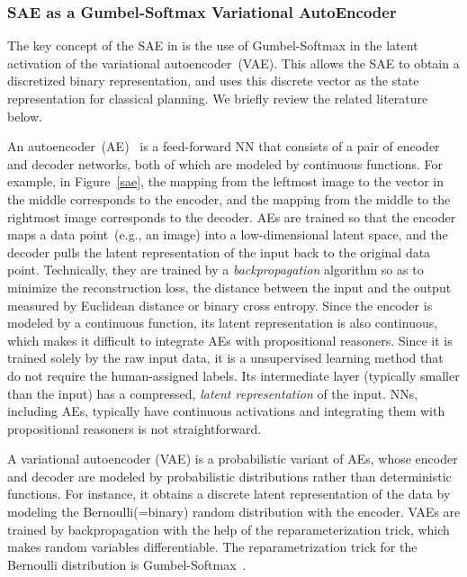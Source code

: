 \subsubsection{SAE as a Gumbel-Softmax Variational AutoEncoder}

The key concept of the SAE in \latentplanner is the use of Gumbel-Softmax \cite{jang2016categorical}
in the latent activation of the variational autoencoder~(VAE).
This allows the SAE to obtain a discretized binary representation, and \latentplanner uses this
discrete vector as the state representation for classical planning.
We briefly review the related literature below.

An autoencoder~(AE)~\cite{hinton2006reducing} is a feed-forward NN that consists of a pair of encoder and decoder networks, both of which are modeled by continuous functions.
For example, in Figure~\ref{sae}, the mapping from the leftmost image to the vector in the middle corresponds to the encoder, and the mapping from the middle to the rightmost image corresponds to the decoder.
AEs are trained so that the encoder maps a data point~(e.g., an image) into a low-dimensional latent space, and the decoder pulls the latent representation of the input back to the original data point.
Technically, they are trained by a \emph{backpropagation} algorithm so as to minimize the reconstruction loss, the distance between the input and the output measured by Euclidean distance or binary cross entropy.
Since the encoder is modeled by a continuous function, its latent representation is also continuous, which makes it difficult to integrate AEs with propositional reasoners.
Since it is trained solely by the raw input data, it is a unsupervised learning method that do not require the human-assigned labels.
Its intermediate layer (typically smaller than the input) has a compressed, \emph{latent representation} of the input.
NNs, including AEs, typically have continuous activations and integrating them with propositional reasoners is not straightforward.
\fi

A variational autoencoder (VAE) \cite{kingma2013auto} is a probabilistic variant of AEs, whose encoder and decoder are modeled by probabilistic distributions rather than deterministic functions.
For instance,
it obtains a discrete latent representation of the data by modeling the Bernoulli(=binary) random distribution with the encoder.
VAEs are trained by backpropagation with the help of the reparameterization trick, which makes random variables differentiable.
The reparametrization trick for the Bernoulli distribution is Gumbel-Softmax~\cite{jang2016categorical}.

